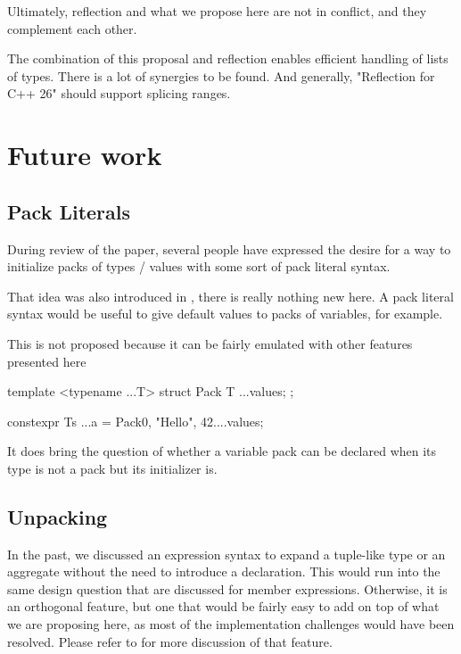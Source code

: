 \documentclass{wg21}
\begin{document}
Ultimately, reflection and what we propose here are not in conflict,
and they complement each other.

The combination of this proposal and reflection enables efficient handling of lists of types.
There is a lot of synergies to be found.
And generally, "Reflection for C++ 26" should support splicing ranges.

\section{Future work}

\subsection{Pack Literals}

During review of the paper, several people have expressed the desire for a way to
initialize packs of types / values with some sort of pack literal syntax.

That idea was also introduced in , there is really nothing new here.
A pack literal syntax would be useful to give default values to packs of variables, for example.

This is not proposed because it can be fairly emulated with other features presented here

\begin{colorblock}
template <typename ...T>
struct Pack {
    T ...values;
};

constexpr Ts ...a = Pack{0, "Hello", 42}....values;
\end{colorblock}

It does bring the question of whether a variable pack can be declared
when its type is not a pack but its initializer is.

\subsection{Unpacking}

In the past, we discussed an expression syntax to expand a tuple-like type or an aggregate without the need to introduce
a declaration. This would run into the same design question that are discussed for member expressions.
Otherwise, it is an orthogonal feature, but one that would be fairly easy to add on top of what we are proposing here,
as most of the implementation challenges would have been resolved.
Please refer to  for more discussion of that feature.
\end{document}
